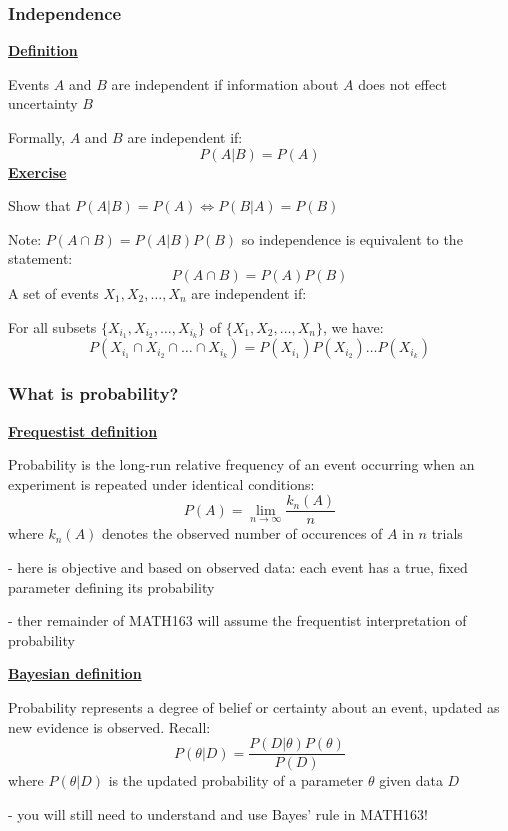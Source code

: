 \documentclass[t,8pt]{beamer}%
\begin{document}
    \begin{frame}
    	\frametitle{Independence}
    	{\bf\underline{Definition}} \par
    	Events $A$ and $B$ are independent if information about $A$ does not effect uncertainty $B$ \par
    	Formally, $A$ and $B$ are independent if:
    	$$P(A\vert B)=P(A)$$
    	{\bf\underline{Exercise}} \par
    	Show that $P(A\vert B)=P(A)\Leftrightarrow P(B\vert A)=P(B)$ \par
        Note: $P(A\cap B)=P(A\vert B)P(B)$ so independence is equivalent to the statement:
        $$P(A\cap B)=P(A)P(B)$$
        A set of events $X_1,X_2,\dots,X_n$ are independent if: \par
        For all subsets $\{X_{i_1},X_{i_2},\dots,X_{i_k}\}$ of $\{X_1,X_2,\dots,X_n\}$, we have:
        $$P(X_{i_1}\cap X_{i_2}\cap\dots\cap X_{i_k})=P(X_{i_1})P(X_{i_2})\dots P(X_{i_k})$$
    \end{frame}
	
	\begin{frame}
		\frametitle{What is probability?}
		{\bf\underline{Frequestist definition}} \par
		Probability is the long-run relative frequency of an event occurring when an experiment is repeated under identical conditions:
		$$P(A)=\lim_{n\rightarrow\infty}\frac{k_n(A)}n$$
		where $k_n(A)$ denotes the observed number of occurences of $A$ in $n$ trials \par
		{\small\color{NavyBlue} - here is objective and based on observed data: each event has a true, fixed parameter defining its probability \par
			- ther remainder of MATH163 will assume the frequentist interpretation of probability} \par
		{\bf\underline{Bayesian definition}} \par
		Probability represents a degree of belief or certainty about an event, updated as new evidence is observed. Recall:
		$$P(\theta\vert D)=\frac{P(D\vert\theta)P(\theta)}{P(D)}$$
		where $P(\theta\vert D)$ is the updated probability of a parameter $\theta$ given data $D$ \par
		{\small\color{NavyBlue} - you will still need to understand and use Bayes' rule in MATH163!}
	\end{frame}
	
\end{document}
